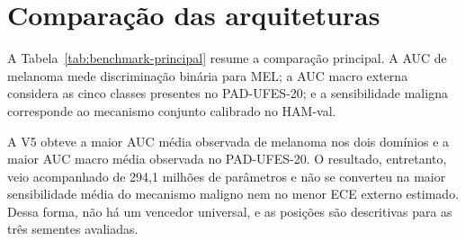 \documentclass[oneside,english,brazilian]{UNISINOSmonografia}
\begin{document}
\section{Comparação das arquiteturas}

A Tabela~\ref{tab:benchmark-principal} resume a comparação principal. A AUC de melanoma mede discriminação binária para MEL; a AUC macro externa considera as cinco classes presentes no PAD-UFES-20; e a sensibilidade maligna corresponde ao mecanismo conjunto calibrado no HAM-val.

\begin{table}[H]
\centering
\caption{Resultados principais, média $\pm$ desvio-padrão populacional em três sementes.}
\label{tab:benchmark-principal}
\end{table}

A V5 obteve a maior AUC média observada de melanoma nos dois domínios e a maior AUC macro média observada no PAD-UFES-20. O resultado, entretanto, veio acompanhado de 294,1 milhões de parâmetros e não se converteu na maior sensibilidade média do mecanismo maligno nem no menor ECE externo estimado. Dessa forma, não há um vencedor universal, e as posições são descritivas para as três sementes avaliadas.
\end{document}
